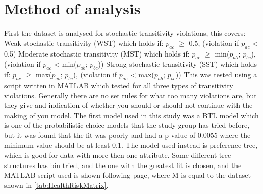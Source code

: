 \section{Method of analysis}
\label{Method of analysis}
First the dataset is analysed for stochastic transitivity violations, this covers:\newline
Weak stochastic transitivity (WST) which holds if:\newline
\indent $p_{ac}$ $\geq$ 0.5, (violation if $p_{ac}$ < 0.5)\newline
Moderate stochastic transitivity (MST) which holds if:\newline
\indent $p_{ac}$ $\geq$ min($p_{ab}$; $p_{bc}$), (violation if $p_{ac}$ < min($p_{ab}$; $p_{bc}$))\newline
Strong stochastic transitivity (SST) which holds if:\newline
\indent $p_{ac}$ $\geq$ max($p_{ab}$; $p_{bc}$), (violation if $p_{ac}$ < max($p_{ab}$; $p_{bc}$))\newline
This was tested using a script written in MATLAB which tested for all three types of transitivity violations.
Generally there are no set rules for what too many violations are, but they give and indication of whether you should or should not continue with the making of you model.
The first model used in this study was a BTL model which is one of the probabilistic choice models that the study group has tried before, but it was found that the fit was poorly and had a p-value of 0.0055 where the minimum value should be at least 0.1. 
The model used instead is preference tree, which is good for data with more then one attribute. Some different tree structures has bin tried, and the one with the greatest fit is chosen, and the MATLAB script used is shown following page, where M is equal to the dataset shown in \autoref{tab:HealthRiskMatrix}.
\newpage

